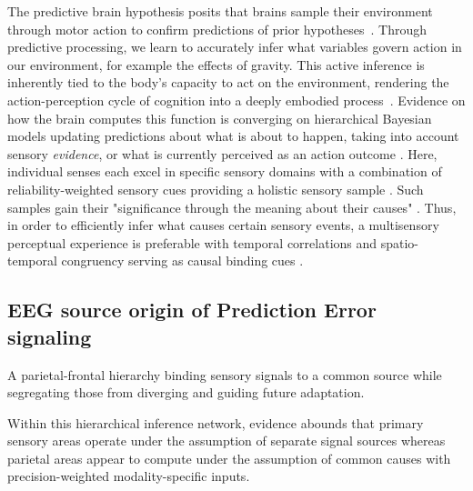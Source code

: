 

The predictive brain hypothesis posits that brains sample their environment through motor action to confirm predictions of prior hypotheses~\cites{Clark2013, Friston2010, Rao1999}. Through predictive processing, we learn to accurately infer what variables govern action in our environment, for example the effects of gravity. This active inference is inherently tied to the body's capacity to act on the environment, rendering the action-perception cycle of cognition into a deeply embodied process~\cite{Friston2012}. Evidence on how the brain computes this function is converging on hierarchical Bayesian models updating predictions about what is about to happen, taking into account sensory \textit{evidence}, or what is currently perceived as an action outcome \cite{Knill2004, Shams2010}. Here, individual senses each excel in specific sensory domains with a combination of reliability-weighted sensory cues providing a holistic sensory sample \cite{Fetsch2012, Cao2019}. Such samples gain their "significance through the meaning about their causes" \cite{Kording2007}. Thus, in order to efficiently infer what causes certain sensory events, a multisensory perceptual experience is preferable with temporal correlations and spatio-temporal congruency serving as causal binding cues \cite{Robertson2003}.

\subsection{EEG source origin of Prediction Error signaling} %


A parietal-frontal hierarchy binding sensory signals to a common source while segregating those from diverging and guiding future adaptation. 

Within this hierarchical inference network, evidence abounds that primary sensory areas operate under the assumption of separate signal sources whereas parietal areas appear to compute under the assumption of common causes with precision-weighted modality-specific inputs.

